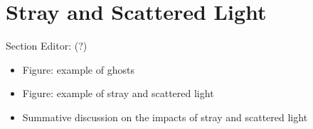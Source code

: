 \section{Stray and Scattered Light}
\label{sec:stray_light}

Section Editor: (?)

\begin{itemize}
    \item Figure: example of ghosts
    \item Figure: example of stray and scattered light
    \item Summative discussion on the impacts of stray and scattered light
\end{itemize}